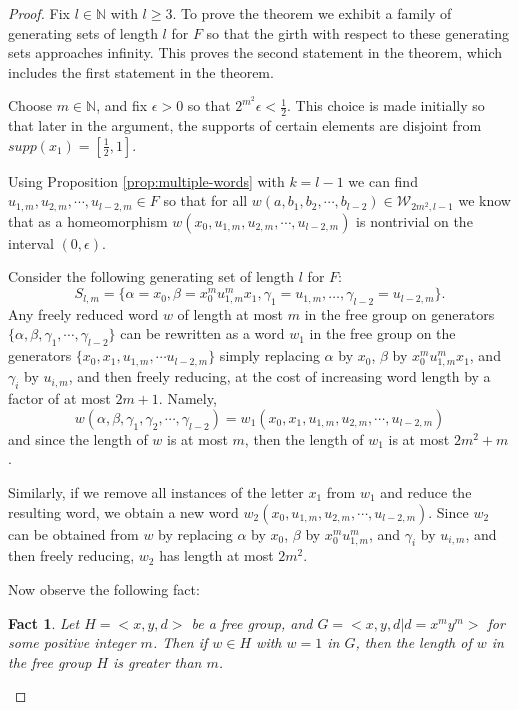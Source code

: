 \documentclass[11pt]{amsart}
\newtheorem{fact}[theorem]{Fact}
\begin{document}
\begin{proof}
Fix $l \in {\mathbb N}$ with $l \geq 3$.  To prove the theorem we exhibit a
family of generating sets of length $l$ for $F$ so that the girth
with respect to these generating sets approaches infinity. This
proves the second statement in the theorem, which includes the
first statement in the theorem.

Choose $m \in {\mathbb N}$, and fix $\epsilon>0$ so that $2^{m^2} \epsilon <
\frac{1}{2}$. This choice is made initially so that later in the
argument, the supports of certain elements are disjoint from
$supp(x_1) = [\frac{1}{2},1]$.

Using Proposition \ref{prop:multiple-words} with $k=l-1$ we can
find $u_{1,m},u_{2,m}, \cdots ,u_{l-2,m} \in F$ so that for all
$w(a,b_1,b_2, \cdots ,b_{l-2}) \in {\mathcal W}_{2m^2,l-1}$ we
know that as a homeomorphism $w(x_0, u_{1,m},u_{2,m},
\cdots ,u_{l-2,m})$ is nontrivial on the interval $(0,\epsilon)$.

Consider the following generating set of length $l$ for $F$:
$$ S_{l,m}= \{ \alpha = x_0, \beta = x_0^mu_{1,m}^mx_1, \gamma_1 = u_{1,m},\ldots,\gamma_{l-2} = u_{l-2,m} \}.$$
Any freely reduced word $w$ of length at most $m$ in the free group on generators $\{\alpha, \beta, \gamma_1, \cdots, \gamma_{l-2} \}$ can be rewritten as a word $w_1$ in the free group on the generators $\{x_0, x_1, u_{1,m}, \cdots u_{l-2,m}\}$ simply replacing $\alpha$ by $x_0$, $\beta$ by $x_0^m u_{1,m}^m x_1$, and $\gamma_i$ by $u_{i,m}$, and then freely reducing, at the cost of increasing word length by a factor of at most $2m+1$. Namely,
$$w(\alpha,\beta,\gamma_1,\gamma_2, \cdots ,\gamma_{l-2})=w_1(x_0,x_1,u_{1,m},u_{2,m}, \cdots ,u_{l-2,m})$$
and since the length of $w$ is at most $m$, then the length of $w_1$
is at most $2m^2+m$.

Similarly, if we remove all instances of the letter $x_1$ from
$w_1$ and reduce the resulting word, we obtain a new word
$w_2(x_0,u_{1,m},u_{2,m}, \cdots ,u_{l-2,m})$. Since $w_2$ can be obtained from $w$ by replacing $\alpha$ by $x_0$, $\beta$ by $x_0^m u_{1,m}^m$, and $\gamma_i$ by $u_{i,m}$, and then freely reducing, $w_2$ has length at most $2m^2$.

Now observe the following fact:

\begin{fact}\label{fact}
Let $H=<x,y,d>$ be a free group, and $G=<x,y,d |d=x^my^m>$ for some positive integer $m$. Then if $w \in H$ with $w=1$ in $G$, then the length of $w$ in the free group $H$ is greater than $m$.
\end{fact}


\end{proof}
\end{document}
